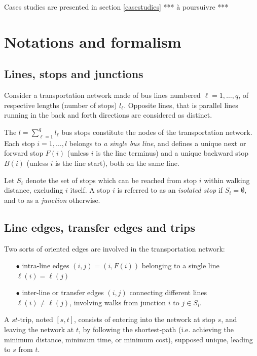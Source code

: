 \documentclass{bmcart}
\begin{document}
Cases studies are presented in section \ref{casestudies} *** à poursuivre *** 






\section{Notations and formalism}
\label{notforma}
\subsection{Lines, stops  and junctions}
\label{Lines and junctions}
Consider a transportation network made of bus lines numbered $\ell=1,\ldots, q$, of respective lengths (number of stops) $l_\ell$.  Opposite lines, that is parallel lines running in the back and forth directions are considered as distinct. 

The $l=\sum_{\ell=1}^ql_\ell$ bus stops constitute the nodes of the transportation network. Each stop $i=1,\ldots,l$ belongs to {\em  a single bus line}, and defines a unique next or forward stop $F(i)$ (unless $i$ is the line terminus) and a unique backward stop $B(i)$ (unless $i$ is the line start), both on the same line.  

Let $S_i$ denote the set of stops which can be reached from stop $i$ within walking distance, excluding $i$ itself. A stop $i$ is referred to as an {\em isolated stop} if $S_i=\emptyset$, and to as a {\em junction} otherwise. 


\subsection{Line edges, transfer edges and trips}
\label{Line edges, transfer edges and trips}
Two sorts of oriented edges are involved in the transportation network: 
\begin{enumerate}
  \item[$\bullet$] intra-line edges $(i,j)=(i,F(i))$ belonging to a single line  $\ell(i)=\ell(j)$
  \item[$\bullet$] inter-line or transfer edges $(i,j)$ connecting different lines $\ell(i)\neq \ell(j)$, involving walks from junction $i$ to $j\in S_i$.
  \end{enumerate}
A $st$-trip, noted $[s,t]$, consists of entering into the network at stop $s$, and leaving the network at $t$, by following the shortest-path (i.e. achieving the minimum distance,  minimum time, or  minimum cost), supposed unique, leading to $s$ from $t$. 
\end{document}
